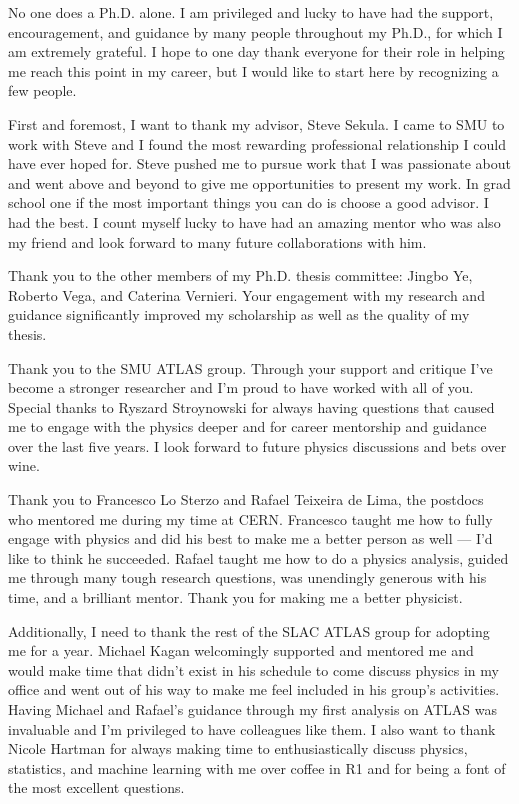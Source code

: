 No one does a Ph.D. alone.
I am privileged and lucky to have had the support, encouragement, and guidance by many people throughout my Ph.D., for which I am extremely grateful.
I hope to one day thank everyone for their role in helping me reach this point in my career, but I would like to start here by recognizing a few people.

First and foremost, I want to thank my advisor, Steve Sekula.
I came to SMU to work with Steve and I found the most rewarding professional relationship I could have ever hoped for.
Steve pushed me to pursue work that I was passionate about and went above and beyond to give me opportunities to present my work.
In grad school one if the most important things you can do is choose a good advisor.
I had the best.
I count myself lucky to have had an amazing mentor who was also my friend and look forward to many future collaborations with him.


Thank you to the other members of my Ph.D. thesis committee: Jingbo Ye, Roberto Vega, and Caterina Vernieri.
Your engagement with my research and guidance significantly improved my scholarship as well as the quality of my thesis.

Thank you to the SMU ATLAS group.
Through your support and critique I've become a stronger researcher and I'm proud to have worked with all of you.
Special thanks to Ryszard Stroynowski for always having questions that caused me to engage with the physics deeper and for career mentorship and guidance over the last five years.
I look forward to future physics discussions and bets over wine.

Thank you to Francesco Lo Sterzo and Rafael Teixeira de Lima, the postdocs who mentored me during my time at CERN.
Francesco taught me how to fully engage with physics and did his best to make me a better person as well --- I'd like to think he succeeded.
Rafael taught me how to do a physics analysis, guided me through many tough research questions, was unendingly generous with his time, and a brilliant mentor.
Thank you for making me a better physicist.

Additionally, I need to thank the rest of the SLAC ATLAS group for adopting me for a year.
Michael Kagan welcomingly supported and mentored me and would make time that didn't exist in his schedule to come discuss physics in my office and went out of his way to make me feel included in his group's activities.
Having Michael and Rafael's guidance through my first analysis on ATLAS was invaluable and I’m privileged to have colleagues like them.
I also want to thank Nicole Hartman for always making time to enthusiastically discuss physics, statistics, and machine learning with me over coffee in R1 and for being a font of the most excellent questions.

